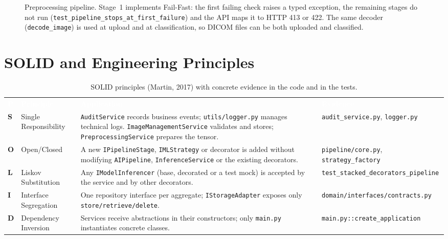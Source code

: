 \documentclass[12pt,a4paper]{article}
\newcommand{\fp}[1]{\nolinkurl{#1}}
\newcommand{\hd}[1]{\textcolor{white}{\textbf{#1}}}
\begin{document}
\begin{figure}[H]
{}
\caption{Preprocessing pipeline. Stage~1 implements Fail-Fast: the first failing check raises a typed
exception, the remaining stages do not run (\fp{test_pipeline_stops_at_first_failure}) and the API
maps it to HTTP 413 or 422. The same decoder (\texttt{decode\_image}) is used at upload and at
classification, so DICOM files can be both uploaded and classified.}
\label{fig:pipeline}
\end{figure}

\section{SOLID and Engineering Principles}

\begin{table}[H]
\centering
\caption{SOLID principles (Martin, 2017) with concrete evidence in the code and in the tests.}
\label{tab:solid}
\renewcommand{\arraystretch}{1.3}
\begin{tabularx}{\textwidth}{C{0.5cm} L{2.4cm} Y L{3.6cm}}
\hd{P} & \hd{Principle} & \hd{Application} & \hd{Evidence} \\
\textbf{S} & Single Responsibility & \texttt{AuditService} records business events; \texttt{utils/logger.py} manages technical logs. \fp{ImageManagementService} validates and stores; \fp{PreprocessingService} prepares the tensor. & \texttt{audit\_service.py}, \texttt{logger.py} \\
\textbf{O} & Open/Closed & A new \texttt{IPipelineStage}, \texttt{IMLStrategy} or decorator is added without modifying \texttt{AIPipeline}, \texttt{InferenceService} or the existing decorators. & \texttt{pipeline/core.py}, \texttt{strategy\_factory} \\
\textbf{L} & Liskov Substitution & Any \texttt{IModelInferencer} (base, decorated or a test mock) is accepted by the service and by other decorators. & \fp{test_stacked_decorators_pipeline} \\
\textbf{I} & Interface Segregation & One repository interface per aggregate; \texttt{IStorageAdapter} exposes only \fp{store/retrieve/delete}. & \fp{domain/interfaces/contracts.py} \\
\textbf{D} & Dependency Inversion & Services receive abstractions in their constructors; only \texttt{main.py} instantiates concrete classes. & \fp{main.py::create_application} \\
\end{tabularx}
\end{table}
\end{document}
